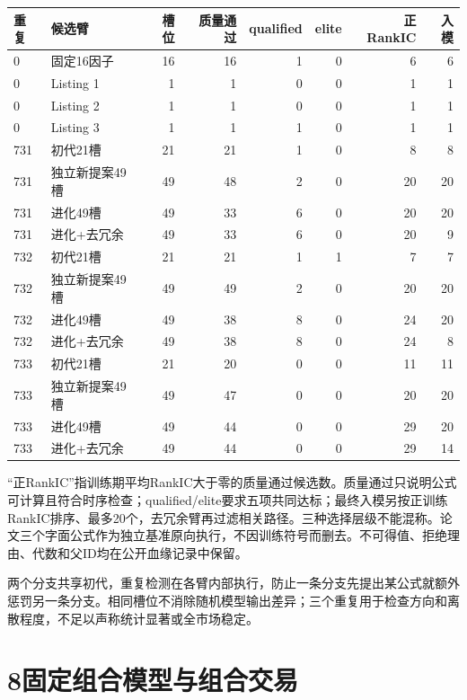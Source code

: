 \documentclass[UTF8,a4paper,10pt]{ctexart}
\newcommand{\lead}[1]{\par\noindent{\bfseries\color{accent}#1}\par}
\newcommand{\page}[1]{\newpage\section*{#1}}
\begin{document}
\begin{center}\scriptsize\begin{tabularx}{\textwidth}{lp{29mm}rrrrrr}\toprule
重复 & 候选臂 & 槽位 & 质量通过 & qualified & elite & 正RankIC & 入模\\\midrule
0 & 固定16因子 & 16 & 16 & 1 & 0 & 6 & 6\\
0 & Listing 1 & 1 & 1 & 0 & 0 & 1 & 1\\
0 & Listing 2 & 1 & 1 & 0 & 0 & 1 & 1\\
0 & Listing 3 & 1 & 1 & 1 & 0 & 1 & 1\\
731 & 初代21槽 & 21 & 21 & 1 & 0 & 8 & 8\\
731 & 独立新提案49槽 & 49 & 48 & 2 & 0 & 20 & 20\\
731 & 进化49槽 & 49 & 33 & 6 & 0 & 20 & 20\\
731 & 进化+去冗余 & 49 & 33 & 6 & 0 & 20 & 9\\
732 & 初代21槽 & 21 & 21 & 1 & 1 & 7 & 7\\
732 & 独立新提案49槽 & 49 & 49 & 2 & 0 & 20 & 20\\
732 & 进化49槽 & 49 & 38 & 8 & 0 & 24 & 20\\
732 & 进化+去冗余 & 49 & 38 & 8 & 0 & 24 & 8\\
733 & 初代21槽 & 21 & 20 & 0 & 0 & 11 & 11\\
733 & 独立新提案49槽 & 49 & 47 & 0 & 0 & 20 & 20\\
733 & 进化49槽 & 49 & 44 & 0 & 0 & 29 & 20\\
733 & 进化+去冗余 & 49 & 44 & 0 & 0 & 29 & 14\\
\bottomrule\end{tabularx}\end{center}

“正RankIC”指训练期平均RankIC大于零的质量通过候选数。质量通过只说明公式可计算且符合时序检查；qualified/elite要求五项共同达标；最终入模另按正训练RankIC排序、最多20个，去冗余臂再过滤相关路径。三种选择层级不能混称。论文三个字面公式作为独立基准原向执行，不因训练符号而删去。不可得值、拒绝理由、代数和父ID均在公开血缘记录中保留。

\lead{同预算对照解释的边界}

两个分支共享初代，重复检测在各臂内部执行，防止一条分支先提出某公式就额外惩罚另一条分支。相同槽位不消除随机模型输出差异；三个重复用于检查方向和离散程度，不足以声称统计显著或全市场稳定。

\page{8\quad 固定组合模型与组合交易}
\end{document}
